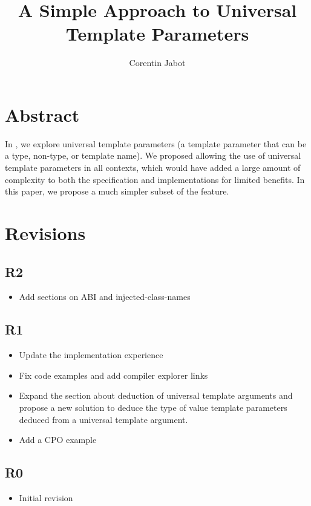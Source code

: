 \documentclass{wg21}
\title{A Simple Approach to Universal Template Parameters}
\author{Corentin Jabot}{corentin.jabot@gmail.com}
\begin{document}
\maketitle

\section{Abstract}
In , we explore universal template parameters (a template parameter that can be a type, non-type, or template name).
We proposed allowing the use of universal template parameters in all contexts, which would have added a large amount of complexity to both the specification and implementations
for limited benefits. In this paper, we propose a much simpler subset of the feature.


\section{Revisions}

\subsection{R2}

\begin{itemize}
\item Add sections on ABI and injected-class-names
\end{itemize}

\subsection{R1}

\begin{itemize}
\item Update the implementation experience
\item Fix code examples and add compiler explorer links
\item Expand the section about deduction of universal template arguments and propose a new solution to deduce the type of value template parameters deduced from a universal template argument.
\item Add a CPO example
\end{itemize}

\subsection{R0}

\begin{itemize}
    \item{Initial revision}
\end{itemize}
\end{document}
